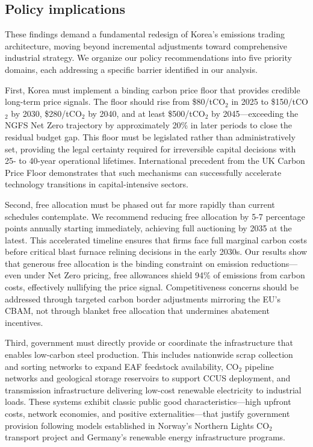 \documentclass[preprint,1p,authoryear]{elsarticle}
\begin{document}
\subsection{Policy implications}

These findings demand a fundamental redesign of Korea's emissions trading architecture, moving beyond incremental adjustments toward comprehensive industrial strategy. We organize our policy recommendations into five priority domains, each addressing a specific barrier identified in our analysis.

First, Korea must implement a binding carbon price floor that provides credible long-term price signals. The floor should rise from \$80/tCO$_2$ in 2025 to \$150/tCO$_2$ by 2030, \$280/tCO$_2$ by 2040, and at least \$500/tCO$_2$ by 2045—exceeding the NGFS Net Zero trajectory by approximately 20\% in later periods to close the residual budget gap. This floor must be legislated rather than administratively set, providing the legal certainty required for irreversible capital decisions with 25- to 40-year operational lifetimes. International precedent from the UK Carbon Price Floor demonstrates that such mechanisms can successfully accelerate technology transitions in capital-intensive sectors.

Second, free allocation must be phased out far more rapidly than current schedules contemplate. We recommend reducing free allocation by 5-7 percentage points annually starting immediately, achieving full auctioning by 2035 at the latest. This accelerated timeline ensures that firms face full marginal carbon costs before critical blast furnace relining decisions in the early 2030s. Our results show that generous free allocation is the binding constraint on emission reductions—even under Net Zero pricing, free allowances shield 94\% of emissions from carbon costs, effectively nullifying the price signal. Competitiveness concerns should be addressed through targeted carbon border adjustments mirroring the EU's CBAM, not through blanket free allocation that undermines abatement incentives.

Third, government must directly provide or coordinate the infrastructure that enables low-carbon steel production. This includes nationwide scrap collection and sorting networks to expand EAF feedstock availability, CO$_2$ pipeline networks and geological storage reservoirs to support CCUS deployment, and transmission infrastructure delivering low-cost renewable electricity to industrial loads. These systems exhibit classic public good characteristics—high upfront costs, network economies, and positive externalities—that justify government provision following models established in Norway's Northern Lights CO$_2$ transport project and Germany's renewable energy infrastructure programs.
\end{document}
